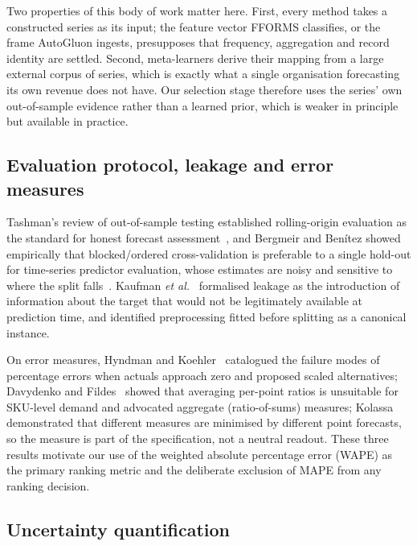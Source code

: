 \documentclass[conference]{IEEEtran}
\begin{document}
Two properties of this body of work matter here. First, every method takes a
constructed series as its input; the feature vector FFORMS classifies, or the
frame AutoGluon ingests, presupposes that frequency, aggregation and record
identity are settled. Second, meta-learners derive their mapping from a large
external corpus of series, which is exactly what a single organisation
forecasting its own revenue does not have. Our selection stage therefore uses
the series' own out-of-sample evidence rather than a learned prior, which is
weaker in principle but available in practice.

\subsection{Evaluation protocol, leakage and error measures}

Tashman's review of out-of-sample testing established rolling-origin
evaluation as the standard for honest forecast
assessment~\cite{tashman2000outofsample}, and Bergmeir and Ben\'itez showed
empirically that blocked/ordered cross-validation is preferable to a single
hold-out for time-series predictor evaluation, whose estimates are noisy and
sensitive to where the split
falls~\cite{bergmeir2012cv}. Kaufman \emph{et al.}~\cite{kaufman2012leakage}
formalised leakage as the introduction of information about the target that
would not be legitimately available at prediction time, and identified
preprocessing fitted before splitting as a canonical instance.

On error measures, Hyndman and Koehler~\cite{hyndman2006accuracy} catalogued
the failure modes of percentage errors when actuals approach zero and proposed
scaled alternatives; Davydenko and Fildes~\cite{davydenko2013measuring} showed
that averaging per-point ratios is unsuitable for SKU-level demand and
advocated aggregate (ratio-of-sums) measures; Kolassa~\cite{kolassa2020bestpoint}
demonstrated that different measures are minimised by different point
forecasts, so the measure is part of the specification, not a neutral readout.
These three results motivate our use of the weighted absolute percentage
error (WAPE) as the primary ranking metric and the deliberate exclusion of
MAPE from any ranking decision.

\subsection{Uncertainty quantification}
\end{document}
